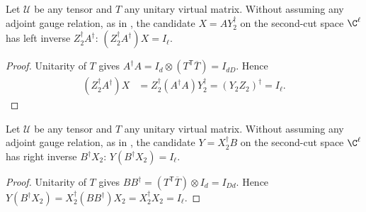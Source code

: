 \begin{lemma}
    \label{thm:mpug_inverse_cut_left_inverse}
    \leanok
    Let $\mathcal U$ be any tensor and $T$ any unitary virtual matrix.
    Without assuming any adjoint gauge relation, as in
    \cite[line~5432]{FrancoRubio2025MPUGauging}, the candidate
    $X=AY_2^\dagger$ on the second-cut space $\C^\ell$ has left inverse
    $Z_2^\dagger A^\dagger$:
    $(Z_2^\dagger A^\dagger)X=I_\ell$.
\end{lemma}
\begin{proof}\leanok
    Unitarity of $T$ gives
    $A^\dagger A=I_d\otimes(T^{\mathsf T}\overline T)=I_{dD}$.
    Hence
    \begin{align}
        (Z_2^\dagger A^\dagger)X
         & =Z_2^\dagger(A^\dagger A)Y_2^\dagger
        =(Y_2Z_2)^\dagger=I_\ell.
    \end{align}
\end{proof}

\begin{lemma}
    \label{thm:mpug_inverse_cut_right_inverse}
    \leanok
    Let $\mathcal U$ be any tensor and $T$ any unitary virtual matrix.
    Without assuming any adjoint gauge relation, as in
    \cite[line~5432]{FrancoRubio2025MPUGauging}, the candidate
    $Y=X_2^\dagger B$ on the second-cut space $\C^\ell$ has right inverse
    $B^\dagger X_2$:
    $Y(B^\dagger X_2)=I_\ell$.
\end{lemma}
\begin{proof}\leanok
    Unitarity of $T$ gives
    $BB^\dagger=(T^{\mathsf T}\overline T)\otimes I_d=I_{Dd}$.
    Hence $Y(B^\dagger X_2)=X_2^\dagger(BB^\dagger)X_2
        =X_2^\dagger X_2=I_\ell$.
\end{proof}

